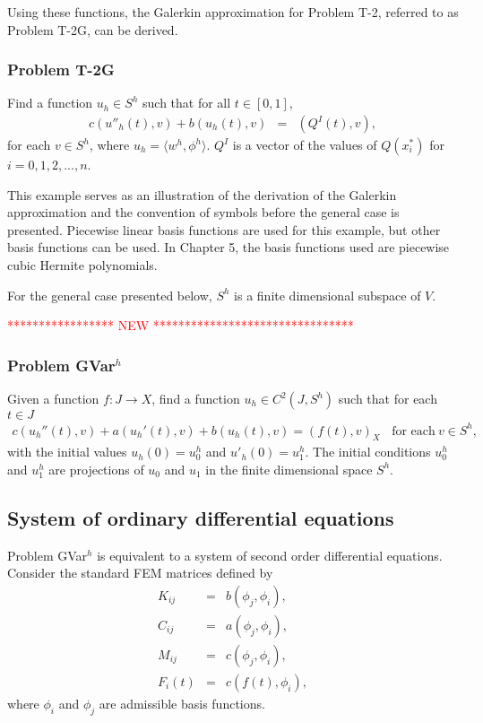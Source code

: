 \documentclass[../../main.tex]{subfiles}
\begin{document}
Using these functions, the Galerkin approximation for Problem T-2, referred to as Problem T-2G, can be derived.

\subsubsection{Problem T-2G}
Find a function $u_h \in S^h$ such that for all $t \in [0,1]$,
\begin{eqnarray*}
	c(u''_h(t),v) + b(u_h(t),v) & = & (Q^I(t),v),
\end{eqnarray*} for each $v \in S^h$, where $u_h = \langle w^h, \phi^h \rangle$. $Q^I$ is a vector of the values of $Q(x^*_i)$ for $i = 0,1,2,...,n$.

This example serves as an illustration of the derivation of the Galerkin approximation and the convention of symbols before the general case is presented. Piecewise linear basis functions are used for this example, but other basis functions can be used. In Chapter 5, the basis functions used are piecewise cubic Hermite polynomials.

For the general case presented below, $S^h$ is a finite dimensional subspace of $V$.

\textcolor{red}{***************** NEW ********************************}


\subsubsection*{Problem GVar$^h$}
Given a function $f: J \rightarrow X$, find a function $u_h \in C^2(J, S^h)$ such that for each $t\in J$
\begin{eqnarray}
	c(u_h''(t),v)+a(u_h'(t),v)+b(u_h(t),v)= (f(t),v)_{X} \ \ \ \ \textrm{for each} \ v \in S^h, \label{DC_E2}
\end{eqnarray}
with the initial values $u_h(0)=u^h_{0}$ and $u'_h(0)=u^h_{1}$. The initial conditions $u^h_{0}$ and $u^h_{1}$ are projections of $u_0$ and $u_1$ in the finite dimensional space $S^h$.

\subsection{System of ordinary differential equations}
Problem GVar$^h$ is equivalent to a system of second order differential equations. Consider the standard FEM matrices defined by
\begin{eqnarray*}
	K_{ij} & = & b(\phi_j, \phi_i),\\
	C_{ij} & = & a(\phi_j, \phi_i),\\
	M_{ij} & = & c(\phi_j, \phi_i),\\
	F_{i}(t) & = & c(f(t), \phi_i),
\end{eqnarray*} where $\phi_i$ and $\phi_j$ are admissible basis functions.
\end{document}
